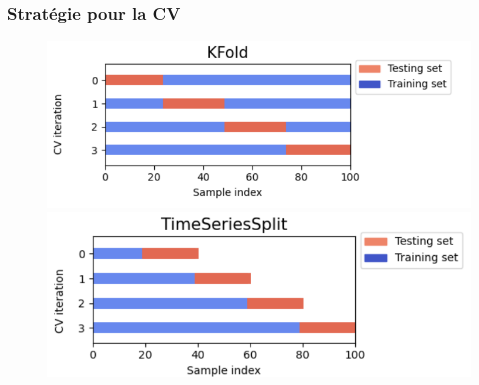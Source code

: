 \documentclass{beamer}[aspectratio = 43]
\begin{document}
\begin{frame}
	\frametitle{Stratégie pour la CV}
		\begin{figure}[h]
			\centering
			\includegraphics[scale=0.4]{kfold}
			\includegraphics[scale=0.4]{tscv}
		\end{figure}
\end{frame}
\end{document}

